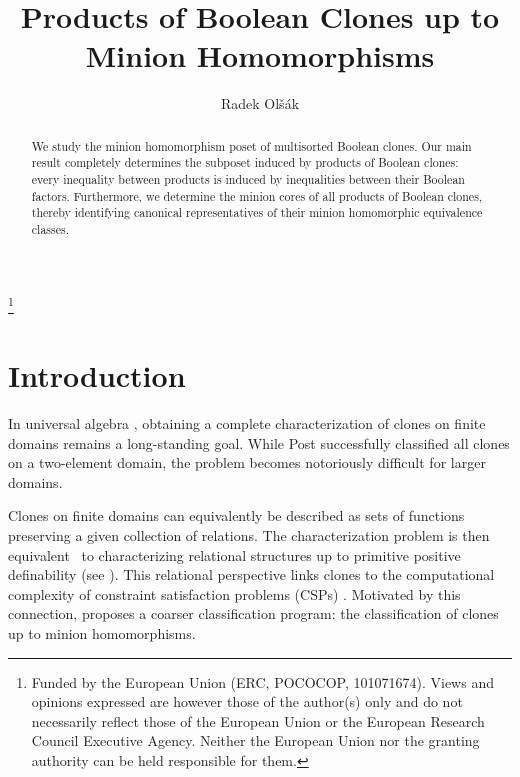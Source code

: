 \documentclass{amsart}
\numberwithin{equation}{section}
\theoremstyle{plain}
\theoremstyle{definition}
\begin{document}
\title[Products of Boolean Clones]{Products of Boolean Clones up to Minion Homomorphisms}

\ifarxiv
\author[R. Olšák]{Radek Olšák}
\fi
\ifau
{}
\fi
\address{Department of Algebra\\Faculty of Mathematics and Physics\\
Charles University\\Prague\\Czech Republic}


\thanks{
Funded by the European Union (ERC, POCOCOP, 101071674). Views and opinions expressed are however those of the author(s) only and do not necessarily reflect those of the European Union or the European Research Council Executive Agency. Neither the European Union nor the granting authority can be held responsible for them.
}


\begin{abstract}
We study the minion homomorphism poset of multisorted Boolean clones. Our main result completely determines the subposet induced by products of Boolean clones: every inequality between products is induced by inequalities between their Boolean factors. Furthermore, we determine the minion cores of all products of Boolean clones, thereby identifying canonical representatives of their minion homomorphic equivalence classes.
\end{abstract}

\maketitle

\section{Introduction}\label{sec:intro}

    In universal algebra \cite{universal1, universal2, universal3}, obtaining a complete characterization of clones on finite domains remains a long-standing goal. While Post \cite{post} successfully classified all clones on a two-element domain, the problem becomes notoriously difficult for larger domains. 

  Clones on finite domains can equivalently be described as sets of functions preserving a given collection of relations. The characterization problem is then equivalent~\cite{bodnarchuk,geiger} to characterizing relational structures up to primitive positive definability (see \cite{cspsurvey}).  
   This relational perspective links clones to the computational complexity of constraint satisfaction problems (CSPs) \cite{cspsurvey}. Motivated by this connection, \cite{wonderland, approach} proposes a coarser classification program: the classification of clones up to minion homomorphisms.
   
\end{document}
